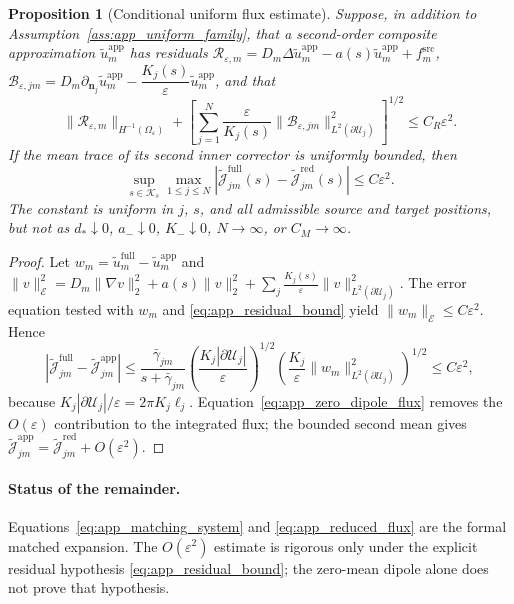\documentclass[pdflatex,sn-mathphys-num]{sn-jnl}
\numberwithin{equation}{section}
\theoremstyle{thmstyleone}%
\newtheorem{proposition}[theorem]{Proposition}
\theoremstyle{definition}
\theoremstyle{remark}
\begin{document}
\begin{appendices}
\begin{proposition}[Conditional uniform flux estimate]
\label{prop:app_flux_error}
Suppose, in addition to Assumption~\ref{ass:app_uniform_family}, that a
second-order composite approximation $\widetilde u_m^{\mathrm{app}}$ has
residuals
$\mathcal R_{\varepsilon,m}=D_m\Delta\widetilde u_m^{\mathrm{app}}
-a(s)\widetilde u_m^{\mathrm{app}}+f_m^{\mathrm{src}}$,
$\mathcal B_{\varepsilon,jm}=D_m\partial_{\mathbf n_j}\widetilde u_m^{\mathrm{app}}
-\dfrac{K_j(s)}{\varepsilon}\widetilde u_m^{\mathrm{app}}$,
and that
\begin{equation}
\|\mathcal R_{\varepsilon,m}\|_{H^{-1}(\Omega_\varepsilon)}
+\left[\sum_{j=1}^N\frac{\varepsilon}{K_j(s)}
\|\mathcal B_{\varepsilon,jm}\|_{L^2(\partial\mathcal U_j)}^2
\right]^{1/2}\leq C_R\varepsilon^2.
\label{eq:app_residual_bound}
\end{equation}
If the mean trace of its second inner corrector is uniformly bounded, then
\[
\sup_{s\in\mathcal K_s}\max_{1\leq j\leq N}
\left|\widetilde{\mathcal J}^{\mathrm{full}}_{jm}(s)
-\widetilde{\mathcal J}^{\mathrm{red}}_{jm}(s)\right|
\leq C\varepsilon^2.
\]
The constant is uniform in $j$, $s$, and all admissible source and target
positions, but not as $d_*\downarrow0$, $a_-\downarrow0$, $K_-\downarrow0$,
$N\to\infty$, or $C_M\to\infty$.
\end{proposition}

\begin{proof}
Let $w_m=\widetilde u_m^{\mathrm{full}}-\widetilde u_m^{\mathrm{app}}$ and
$\|v\|_{\mathcal E}^2=D_m\|\nabla v\|_2^2+a(s)\|v\|_2^2
+\sum_j\frac{K_j(s)}{\varepsilon} \|v\|_{L^2(\partial\mathcal U_j)}^2$.
The error equation tested with $w_m$ and \eqref{eq:app_residual_bound} yield
$\|w_m\|_{\mathcal E}\leq C\varepsilon^2$. Hence
\[
\left|\widetilde{\mathcal J}^{\mathrm{full}}_{jm}
-\widetilde{\mathcal J}^{\mathrm{app}}_{jm}\right| \leq\frac{\bar\gamma_{jm}}{s+\bar\gamma_{jm}}
\left(\frac{K_j|\partial\mathcal U_j|}{\varepsilon}\right)^{1/2}
\left(\frac{K_j}{\varepsilon}
\|w_m\|_{L^2(\partial\mathcal U_j)}^2\right)^{1/2}\leq C\varepsilon^2,
\]
because $K_j|\partial\mathcal U_j|/\varepsilon=2\pi K_j\ell_j$.
Equation~\eqref{eq:app_zero_dipole_flux} removes the $O(\varepsilon)$
contribution to the integrated flux; the bounded second mean gives
$\widetilde{\mathcal J}^{\mathrm{app}}_{jm}
=\widetilde{\mathcal J}^{\mathrm{red}}_{jm}+O(\varepsilon^2)$.
\end{proof}

\paragraph{Status of the remainder.}
Equations~\eqref{eq:app_matching_system} and \eqref{eq:app_reduced_flux} are the
formal matched expansion. The $O(\varepsilon^2)$ estimate is rigorous only
under the explicit residual hypothesis \eqref{eq:app_residual_bound}; the
zero-mean dipole alone does not prove that hypothesis.



\end{appendices}
\end{document}
